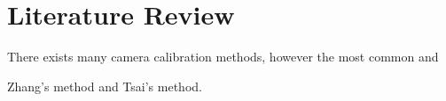 \section{Literature Review}

There exists many camera calibration methods, however the most common and

Zhang's method and Tsai's method. 
